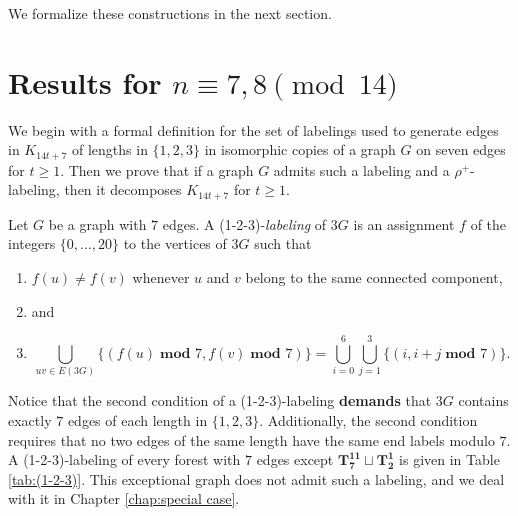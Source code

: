  We formalize these constructions in the next section.
\section{Results for $n\equiv 7,8 \pmod{14}$}\label{sec:7,8result}
We begin with a formal definition for the set of labelings used to generate edges in $K_{14t+7}$ of lengths in $\{1,2,3\}$ in isomorphic copies of a graph $G$ on seven edges for $t\geq 1$. Then we prove that if a graph $G$ admits such a labeling and a $\rho^{+}$-labeling, then it decomposes $K_{14t+7}$ for $t\geq 1$.
\begin{definition}\label{def:1-2-3}
    Let $G$ be a graph with $7$ edges. A (1-2-3)-\emph{labeling} of $3G$ is an assignment $f$ of the integers $\{0,\dots,20\}$ to the vertices of $3G$ such that
    \begin{enumerate}
        \item $f(u) \neq f(v)$ whenever $u$ and $v$ belong to the same connected component,
        \item[] and
        \item $$\bigcup_{uv\in E(3G)} \{(f(u)\; \textbf{mod } 7,f(v)\; \textbf{mod } 7)\}= \bigcup_{i=0}^{6} \bigcup_{j=1}^{3} \{(i,i+j \; \textbf{mod } 7)\}.$$
    \end{enumerate}

\end{definition}
Notice that the second condition of a (1-2-3)-labeling \textbf{demands} that $3G$ contains exactly $7$ edges of each length in $\{1,2,3\}$. Additionally, the second condition requires that no two edges of the same length have the same end labels modulo $7$. A (1-2-3)-labeling of every forest with $7$ edges except $\mathbf{T_{7}^{11}}\sqcup\mathbf{T_{2}^{1}}$ is given in Table \ref{tab:(1-2-3)}. This exceptional graph does not admit such a labeling, and we deal with it in Chapter \ref{chap:special case}. 


